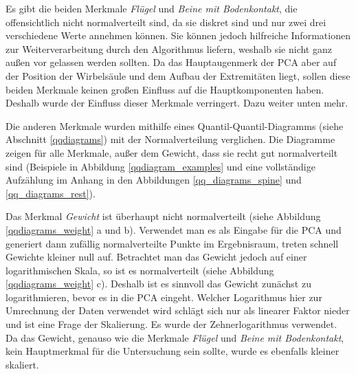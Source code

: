  Es gibt die beiden Merkmale \emph{Flügel} und \emph{Beine mit Bodenkontakt}, die offensichtlich nicht normalverteilt sind, da sie diskret sind und nur zwei \bzw drei verschiedene Werte annehmen können. Sie können jedoch hilfreiche Informationen zur Weiterverarbeitung durch den Algorithmus liefern, weshalb sie nicht ganz außen vor gelassen werden sollten. Da das Hauptaugenmerk der PCA aber auf der Position der Wirbelsäule und dem Aufbau der Extremitäten liegt, sollen diese beiden Merkmale keinen großen Einfluss auf die Hauptkomponenten haben. Deshalb wurde der Einfluss dieser Merkmale verringert. Dazu weiter unten mehr.
 
 Die anderen Merkmale wurden mithilfe eines Quantil-Quantil-Diagramms (siehe Abschnitt \ref{qqdiagrams}) mit der Normalverteilung verglichen.
 Die Diagramme zeigen für alle Merkmale, außer dem Gewicht, dass sie recht gut normalverteilt sind (Beispiele in Abbildung \ref{qqdiagram_examples} und eine vollständige Aufzählung im Anhang in den Abbildungen \ref{qq_diagrams_spine} und \ref{qq_diagrams_rest}).
 
 Das Merkmal \emph{Gewicht} ist überhaupt nicht normalverteilt (siehe Abbildung \ref{qqdiagrams_weight} a und b). Verwendet man es als Eingabe für die PCA und generiert dann zufällig normalverteilte Punkte im Ergebnisraum, treten schnell Gewichte kleiner null auf.
 Betrachtet man das Gewicht jedoch auf einer logarithmischen Skala, so ist es normalverteilt (siehe Abbildung \ref{qqdiagrams_weight} c). Deshalb ist es sinnvoll das Gewicht zunächst zu logarithmieren, bevor es in die PCA eingeht.
 Welcher Logarithmus hier zur Umrechnung der Daten verwendet wird schlägt sich nur als linearer Faktor nieder und ist eine Frage der Skalierung. Es wurde der Zehnerlogarithmus verwendet. 
 Da das Gewicht, genauso wie die Merkmale \emph{Flügel} und \emph{Beine mit Bodenkontakt}, kein Hauptmerkmal für die Untersuchung sein sollte, wurde es ebenfalls kleiner skaliert.
 
